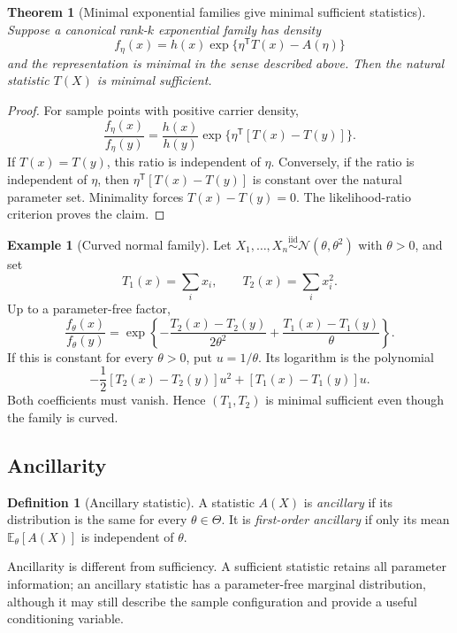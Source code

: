 \documentclass[12pt,oneside]{book}
\numberwithin{equation}{section}
\theoremstyle{definition}
\newtheorem{definition}{Definition}[section]
\newtheorem{example}{Example}[section]
\theoremstyle{plain}
\newtheorem{theorem}{Theorem}[section]
\theoremstyle{remark}
\newcommand{\E}{\mathbb{E}}
\newcommand{\iid}{\overset{\text{iid}}{\sim}}
\newcommand{\Normal}{\mathcal{N}}
\begin{document}
\begin{theorem}[Minimal exponential families give minimal sufficient statistics]
Suppose a canonical rank-$k$ exponential family has density
\[
 f_\eta(x)=h(x)\exp\{\eta^\mathsf TT(x)-A(\eta)\}
\]
and the representation is minimal in the sense described above. Then the
natural statistic $T(X)$ is minimal sufficient.
\end{theorem}

\begin{proof}
For sample points with positive carrier density,
\[
 \frac{f_\eta(x)}{f_\eta(y)}
 =\frac{h(x)}{h(y)}\exp\{\eta^\mathsf T[T(x)-T(y)]\}.
\]
If $T(x)=T(y)$, this ratio is independent of $\eta$. Conversely, if the
ratio is independent of $\eta$, then
$\eta^\mathsf T[T(x)-T(y)]$ is constant over the natural parameter set.
Minimality forces $T(x)-T(y)=0$. The likelihood-ratio criterion proves the
claim.
\end{proof}

\begin{example}[Curved normal family]
Let $X_1,\ldots,X_n\iid\Normal(\theta,\theta^2)$ with $\theta>0$, and set
\[
 T_1(x)=\sum_i x_i,
 \qquad T_2(x)=\sum_i x_i^2.
\]
Up to a parameter-free factor,
\[
 \frac{f_\theta(x)}{f_\theta(y)}
 =\exp\left\{-\frac{T_2(x)-T_2(y)}{2\theta^2}
 +\frac{T_1(x)-T_1(y)}{\theta}\right\}.
\]
If this is constant for every $\theta>0$, put $u=1/\theta$. Its logarithm is
the polynomial
\[
 -\frac12[T_2(x)-T_2(y)]u^2+[T_1(x)-T_1(y)]u.
\]
Both coefficients must vanish. Hence $(T_1,T_2)$ is minimal sufficient even
though the family is curved.
\end{example}

\subsection{Ancillarity}

\begin{definition}[Ancillary statistic]
A statistic $A(X)$ is \emph{ancillary} if its distribution is the same for
every $\theta\in\Theta$. It is \emph{first-order ancillary} if only its mean
$\E_\theta[A(X)]$ is independent of $\theta$.
\end{definition}

Ancillarity is different from sufficiency. A sufficient statistic retains
all parameter information; an ancillary statistic has a parameter-free
marginal distribution, although it may still describe the sample
configuration and provide a useful conditioning variable.
\end{document}
